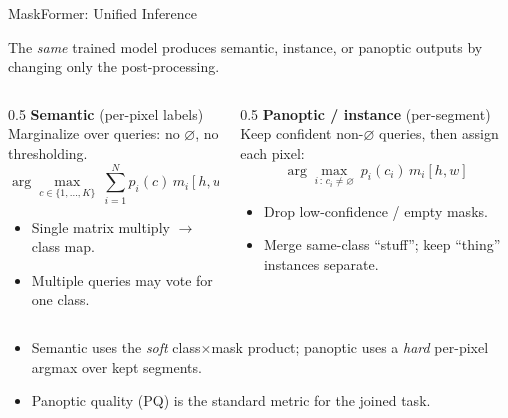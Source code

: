 \begin{frame}{MaskFormer: Unified Inference}

  The \emph{same} trained model produces semantic, instance, or panoptic outputs by changing only the post-processing.

  \vspace{0.4em}
  \begin{columns}[t]
    \begin{column}{0.5\textwidth}
      \textbf{Semantic} (per-pixel labels)\\[2pt]
      Marginalize over queries: no $\varnothing$, no thresholding.
      \[
        \arg\max_{c \in \{1,\dots,K\}}\ \sum_{i=1}^{N} p_i(c)\, m_i[h,w]
      \]
      \begin{itemize}
        \item Single matrix multiply $\to$ class map.
        \item Multiple queries may vote for one class.
      \end{itemize}
    \end{column}
    \begin{column}{0.5\textwidth}
      \textbf{Panoptic / instance} (per-segment)\\[2pt]
      Keep confident non-$\varnothing$ queries, then assign each pixel:
      \[
        \arg\max_{i\,:\,c_i \neq \varnothing}\ p_i(c_i)\, m_i[h,w]
      \]
      \begin{itemize}
        \item Drop low-confidence / empty masks.
        \item Merge same-class ``stuff''; keep ``thing'' instances separate.
      \end{itemize}
    \end{column}
  \end{columns}

  \vspace{0.5em}
  \begin{itemize}
    \item Semantic uses the \emph{soft} class$\times$mask product; panoptic uses a \emph{hard} per-pixel argmax over kept segments.
    \item Panoptic quality (PQ) \cite{kirillov2019panoptic} is the standard metric for the joined task.
  \end{itemize}
\end{frame}


